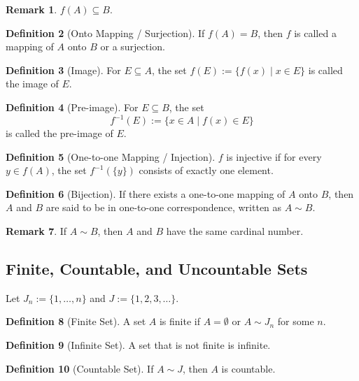 \documentclass[11pt]{book}
\theoremstyle{definition}
\newtheorem{definition}{Definition}[chapter]
\newtheorem{remark}[definition]{Remark}
\theoremstyle{plain}
\begin{document}
\begin{remark}
$f(A) \subseteq B$.
\end{remark}

\begin{definition}[Onto Mapping / Surjection]
If $f(A) = B$, then $f$ is called a mapping of $A$ onto $B$ or a surjection.
\end{definition}

\begin{definition}[Image]
For $E \subseteq A$, the set $f(E) := \{ f(x) \mid x \in E \}$ is called the image of $E$.
\end{definition}

\begin{definition}[Pre-image]
For $E \subseteq B$, the set
\[
f^{-1}(E) := \{ x \in A \mid f(x) \in E \}
\]
is called the pre-image of $E$.
\end{definition}

\begin{definition}[One-to-one Mapping / Injection]
$f$ is injective if for every $y \in f(A)$, the set $f^{-1}(\{y\})$ consists of exactly one element.
\end{definition}

\begin{definition}[Bijection]
If there exists a one-to-one mapping of $A$ onto $B$, then $A$ and $B$ are said to be in one-to-one correspondence,
written as $A \sim B$.
\end{definition}

\begin{remark}
If $A \sim B$, then $A$ and $B$ have the same cardinal number.
\end{remark}

\subsection{Finite, Countable, and Uncountable Sets}

Let $J_n := \{1, \dots, n\}$ and $J := \{1,2,3,\dots\}$.

\begin{definition}[Finite Set]
A set $A$ is finite if $A = \emptyset$ or $A \sim J_n$ for some $n$.
\end{definition}

\begin{definition}[Infinite Set]
A set that is not finite is infinite.
\end{definition}

\begin{definition}[Countable Set]
If $A \sim J$, then $A$ is countable.
\end{definition}
\end{document}

